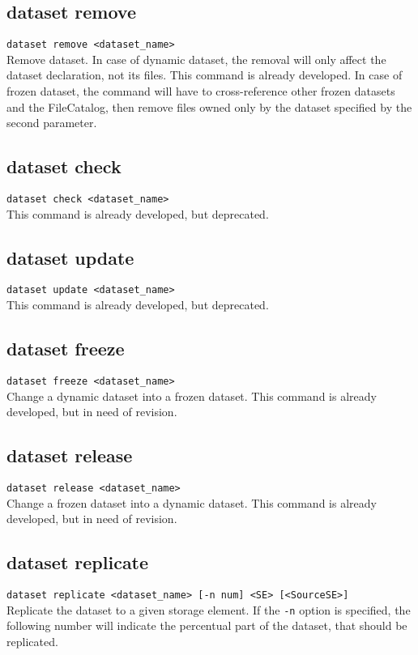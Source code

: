 \documentclass{scrreprt}
\begin{document}
\subsection{dataset remove}
\texttt{dataset remove <dataset_name>} \\
Remove dataset. In case of dynamic dataset, the removal will only affect the dataset declaration, not its files. This command is already developed. In case of frozen dataset, the command will have to cross-reference other frozen datasets and the FileCatalog, then remove files owned only by the dataset specified by the second parameter.

\subsection{dataset check}
\texttt{dataset check <dataset_name>} \\
This command is already developed, but deprecated.

\subsection{dataset update}
\texttt{dataset update <dataset_name>} \\
This command is already developed, but deprecated.

\subsection{dataset freeze}
\texttt{dataset freeze <dataset_name>} \\
Change a dynamic dataset into a frozen dataset. This command is already developed, but in need of revision.  

\subsection{dataset release}
\texttt{dataset release <dataset_name>} \\
Change a frozen dataset into a dynamic dataset. This command is already developed, but in need of revision.  

\subsection{dataset replicate}
\texttt{dataset replicate <dataset_name> [-n num] <SE> [<SourceSE>]} \\
Replicate the dataset to a given storage element. If the \texttt{-n} option is specified, the following number will indicate the percentual part of the dataset, that should be replicated.
\end{document}
